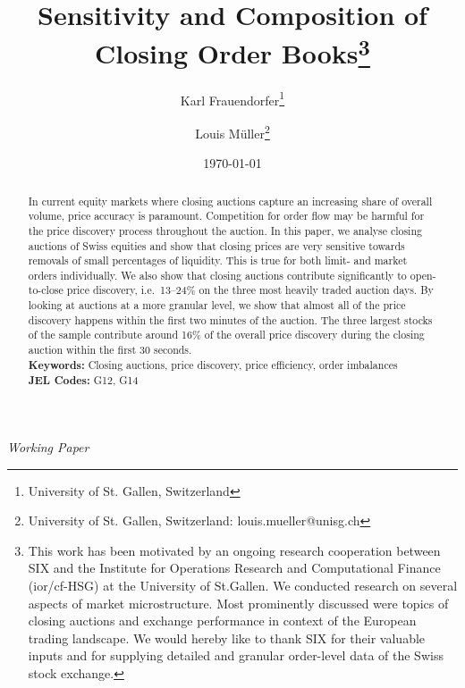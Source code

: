 \documentclass[11pt,a4paper]{article}
\title{Sensitivity and Composition of Closing Order Books\thanks{This work has been motivated by an ongoing research cooperation between \acf{SIX} and the Institute for Operations Research and Computational Finance (ior/cf-HSG) at the University of St.Gallen. We conducted research on several aspects of market microstructure. Most prominently discussed were topics of closing auctions and exchange performance in context of the European trading landscape. We would hereby like to thank SIX for their valuable inputs and for supplying detailed and granular order-level data of the Swiss stock exchange.}}
\author{Karl Frauendorfer\thanks{University of St. Gallen, Switzerland}
\and Louis Müller\thanks{University of St. Gallen, Switzerland: louis.mueller@unisg.ch}
}
\date{\today}
\begin{document}
    \begin{titlepage}

        \centering


        \maketitle

        \vfill

        \emph{Working Paper} \\


        \vfill

        \begin{abstract}
            In current equity markets where closing auctions capture an increasing share of overall volume, price accuracy is paramount. Competition for order flow may be harmful for the price discovery process throughout the auction. In this paper, we analyse closing auctions of Swiss equities and show that closing prices are very sensitive towards removals of small percentages of liquidity. This is true for both limit- and market orders individually. We also show that closing auctions contribute significantly to open-to-close price discovery, i.e.\ 13--24\% on the three most heavily traded auction days. By looking at auctions at a more granular level, we show that almost all of the price discovery happens within the first two minutes of the auction. The three largest stocks of the sample contribute around 16\% of the overall price discovery during the closing auction within the first 30 seconds.\\[8mm]
            \noindent \textbf{Keywords:} Closing auctions, price discovery, price efficiency, order imbalances\\
            \noindent \textbf{JEL Codes:} G12, G14\\

        \end{abstract}


%			

        \thispagestyle{empty}
    \end{titlepage}
\end{document}
